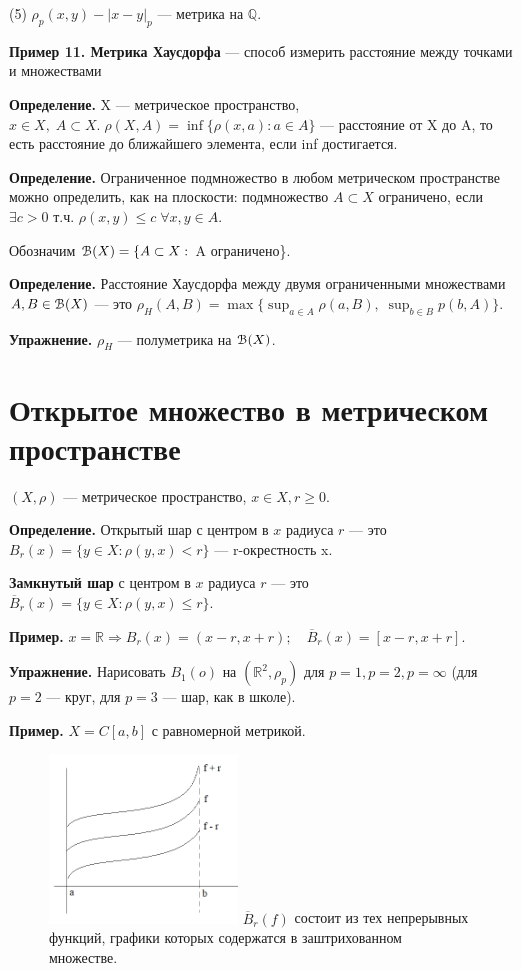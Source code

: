 \documentclass[12pt,a4paper]{article}
\begin{document}
(5) $\rho_{p}(x, y) - |x - y|_{p}$ --- метрика на $\mathbb{Q}.$ 

\textbf{Пример 11. Метрика Хаусдорфа} --- способ измерить расстояние между точками и множествами 

\textbf{Определение.} X --- метрическое пространство, $x \in X, \; A \subset X. \; \rho(X, A) = \inf \{\rho(x, a): a \in A\}$ --- расстояние от X до A, то есть расстояние до ближайшего элемента, если inf достигается. 

\textbf{Определение.} Ограниченное подмножество в любом метрическом пространстве можно определить, как на плоскости: подмножество $A \subset X$ ограничено, если $\exists c > 0$ т.ч. $\rho(x, y) \leqslant c \; \forall x, y \in A$. 

Обозначим $\EuScript{B}(X) = \{A \subset X:$ A ограничено\}. 

\textbf{Определение.} Расстояние Хаусдорфа между двумя ограниченными множествами $A, B \in \EuScript{B}(X)$ --- это $\rho_{H}(A, B) = \max{\{\sup_{a \in A} \rho(a, B), \; \sup_{b \in B} p(b, A)}\}.$ 

\textbf{Упражнение.} $\rho_{H}$ --- полуметрика на $\EuScript{B}(X)$.

\section{Открытое множество в метрическом пространстве}

$(X, \rho)$ --- метрическое пространство, $x \in X, r \geqslant 0$.

\textbf{Определение.} Открытый шар с центром в $x$ радиуса $r$ --- это 
$B_r(x) = \{ y \in X: \rho(y, x) < r\}$ --- r-окрестность x. 

\textbf{Замкнутый шар} с центром в $x$ радиуса $r$ --- это
$\overline{B}_r(x) = \{ y\in X: \rho(y, x) \leqslant r\}.$

\textbf{Пример.} $x = \mathbb{R} \Rightarrow B_r(x) = (x - r, x + r); \quad \overline{B}_r(x) = [x - r, x+r].$

\textbf{Упражнение.} Нарисовать $B_1(o)$ на $(\mathbb{R}^2, \rho_p)$ для $p = 1, p = 2, p = \infty$ (для $p = 2$ --- круг, для $p = 3$ --- шар, как в школе).

\textbf{Пример.} $X = C[a,b]$ с равномерной метрикой.

\begin{figure}
	\includegraphics[width = 5cm]{lect2_1.png}
	$\overline{B}_r(f)$ состоит из тех непрерывных функций, графики которых содержатся в заштрихованном множестве.
\end{figure}
\end{document}
